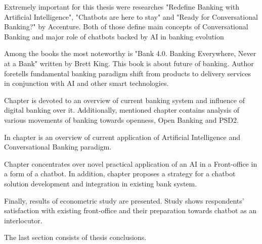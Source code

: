 Extremely important for this thesis were researches "Redefine Banking with Artificial Intelligence", "Chatbots are here to stay" and "Ready for Conversational Banking?" by Accenture.
Both of those define main concepts of Conversational Banking and major role of chatbots backed by AI in banking evolution 

Among the books the most noteworthy is "Bank 4.0. Banking Everywhere, Never at a Bank" written by Brett King.
This book is about future of banking.
Author foretells fundamental banking paradigm shift from products to delivery services in conjunction with AI and other smart technologies.

Chapter  is devoted to an overview of current banking system and influence of digital banking over it.
Additionally, mentioned chapter  contains analysis of various movements of banking towards openness, Open Banking and PSD2.

In chapter  is an overview of current application of Artificial Intelligence and Conversational Banking paradigm.

Chapter  concentrates over novel practical application of an AI in a Front-office in a form of a chatbot.
In addition, chapter  proposes a strategy for a chatbot solution development and integration in existing bank system.

Finally, results of econometric study are presented. 
Study shows respondents' satisfaction with existing front-office and their preparation towards chatbot as an interlocutor.

The last section consists of thesis conclusions. 
